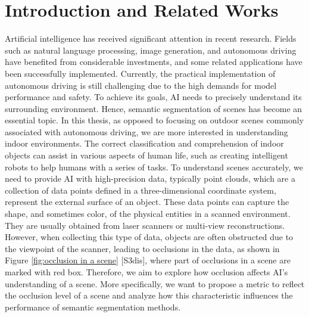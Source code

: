 \documentclass[11pt, a4paper,oneside,chapterprefix=false]{scrbook}
\begin{document}
\chapter{Introduction and Related Works} \label{chp:introduction}


Artificial intelligence has received significant attention in recent research. Fields such as natural language processing, image generation, and autonomous driving have benefited from considerable investments, and some related applications have been successfully implemented. Currently, the practical implementation of autonomous driving is still challenging due to the high demands for model performance and safety. To achieve its goals, AI needs to precisely understand its surrounding environment. Hence, semantic segmentation of scenes has become an essential topic. In this thesis, as opposed to focusing on outdoor scenes commonly associated with autonomous driving, we are more interested in understanding indoor environments. The correct classification and comprehension of indoor objects can assist in various aspects of human life, such as creating intelligent robots to help humans with a series of tasks. To understand scenes accurately, we need to provide AI with high-precision data, typically point clouds, which are a collection of data points defined in a three-dimensional coordinate system, represent the external surface of an object. These data points can capture the shape, and sometimes color, of the physical entities in a scanned environment. They are usually obtained from laser scanners or multi-view reconstructions. However, when collecting this type of data, objects are often obstructed due to the viewpoint of the scanner, leading to occlusions in the data, as shown in Figure \ref{fig:occlusion in a scene} [S3dis], where part of occlusions in a scene are marked with red box. Therefore, we aim to explore how occlusion affects AI's understanding of a scene. More specifically, we want to propose a metric to reflect the occlusion level of a scene and analyze how this characteristic influences the performance of semantic segmentation methods.

\end{document}
